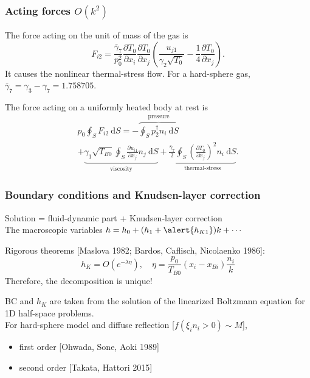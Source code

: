 \documentclass[mathserif]{beamer} %
\newcommand{\dd}{\:\mathrm{d}}
\newcommand{\pder}[2][]{\frac{\partial#1}{\partial#2}}
\newcommand{\OO}[1]{O(#1)}
\begin{document}
\begin{frame}
    \frametitle{Acting forces \(\OO{k^2}\)}
    The force acting on the unit of mass of the gas is
    \begin{equation}\label{eq:gamma7_force}
        F_{i2} = \frac{\bar{\gamma}_7}{p_0^2}\pder[T_0]{x_i}\pder[T_0]{x_j}\left(\frac{u_{j1}}{\gamma_2\sqrt{T_0}}
            - \frac{1}4\pder[T_0]{x_j}\right).
    \end{equation}
    It causes the \alert{nonlinear thermal-stress flow}.
    For a hard-sphere gas, \(\bar{\gamma}_7 = \gamma_3 - \gamma_7 = 1.758705\).
    \vspace{20pt}\pause

    The force acting on a uniformly heated body at rest is
    \begin{multline}\label{eq:force:terms}
        p_0 \oint_S F_{i2} \dd{S} =
            - \overbrace{ \oint_S p_2^\dag n_i \dd{S} }^\text{pressure} \\
            + \underbrace{ \gamma_1 \sqrt{T_{B0}} \oint_S \pder[u_{i1}]{x_j} n_j \dd{S} }_\text{viscosity}
            + \underbrace{ \frac{\bar{\gamma}_7}{2} \oint_S \left(\pder[T_0]{x_j}\right)^2 n_i \dd{S} }_\text{thermal-stress}.
    \end{multline}
\end{frame}

\begin{frame}
    \frametitle{Boundary conditions and Knudsen-layer correction}
    Solution = fluid-dynamic part + Knudsen-layer correction \\
    The macroscopic variables \(h = h_0 + (h_1 + \alert{h_{K1}})k + \cdots\)

    Rigorous theorems {\footnotesize[Maslova 1982; Bardos, Caflisch, Nicolaenko 1986]}:
    \begin{equation}
        h_K = \OO{e^{-\lambda\eta}}, \quad \eta = \frac{p_0}{T_{B0}}(x_i-x_{Bi})\frac{n_i}k
    \end{equation}
    Therefore, the decomposition is unique!
    \pause

    BC and \(h_K\) are taken from the solution of the linearized Boltzmann equation for 1D half-space problems.\\
    For hard-sphere model and diffuse reflection [\(f(\xi_in_i>0)\sim M\)],
    \begin{itemize}
        \item first order [Ohwada, Sone, Aoki 1989]
        \item second order [Takata, Hattori 2015]
    \end{itemize}
\end{frame}
\end{document}
